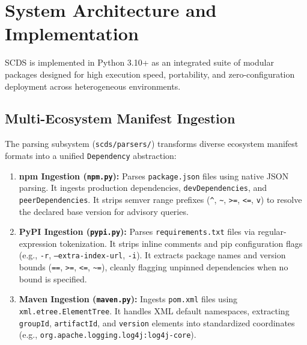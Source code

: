 \section{System Architecture and Implementation}
\label{sec:impl}

SCDS is implemented in Python 3.10+ as an integrated suite of modular packages designed for high execution speed, portability, and zero-configuration deployment across heterogeneous environments.

\subsection{Multi-Ecosystem Manifest Ingestion}
The parsing subsystem (\texttt{scds/parsers/}) transforms diverse ecosystem manifest formats into a unified \texttt{Dependency} abstraction:
\begin{enumerate}
    \item \textbf{npm Ingestion (\texttt{npm.py}):} Parses \texttt{package.json} files using native JSON parsing. It ingests production dependencies, \texttt{devDependencies}, and \texttt{peerDependencies}. It strips semver range prefixes (\texttt{\^{}}, \texttt{\~{}}, \texttt{>=}, \texttt{<=}, \texttt{v}) to resolve the declared base version for advisory queries.
    \item \textbf{PyPI Ingestion (\texttt{pypi.py}):} Parses \texttt{requirements.txt} files via regular-expression tokenization. It strips inline comments and pip configuration flags (e.g., \texttt{-r}, \texttt{--extra-index-url}, \texttt{-i}). It extracts package names and version bounds (\texttt{==}, \texttt{>=}, \texttt{<=}, \texttt{\~{}=}), cleanly flagging unpinned dependencies when no bound is specified.
    \item \textbf{Maven Ingestion (\texttt{maven.py}):} Ingests \texttt{pom.xml} files using \texttt{xml.etree.ElementTree}. It handles XML default namespaces, extracting \texttt{groupId}, \texttt{artifactId}, and \texttt{version} elements into standardized coordinates (e.g., \texttt{org.apache.logging.log4j:log4j-core}).
\end{enumerate}

